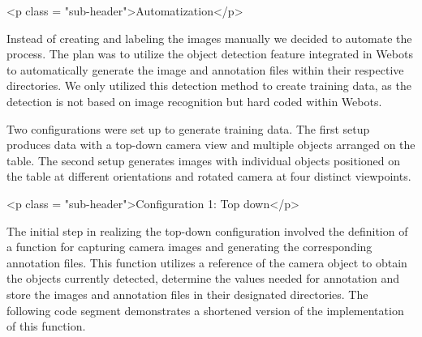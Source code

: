 <p class = "sub-header">Automatization</p>

Instead of creating and labeling the images manually we decided to automate the process. The plan was to utilize the object detection feature integrated in Webots to automatically generate the image and annotation files within their respective directories. We only utilized this detection method to create training data, as the detection is not based on image recognition but hard coded within Webots. 

Two configurations were set up to generate training data. The first setup produces data with a top-down camera view and multiple objects arranged on the table. The second setup generates images with individual objects positioned on the table at different orientations and rotated camera at four distinct viewpoints.

<p class = "sub-header">Configuration 1: Top down</p>

The initial step in realizing the top-down configuration involved the definition of a function for capturing camera images and generating the corresponding annotation files. This function utilizes a reference of the camera object to obtain the objects currently detected, determine the values needed for annotation and store the images and annotation files in their designated directories. The following code segment demonstrates a shortened version of the implementation of this function.

